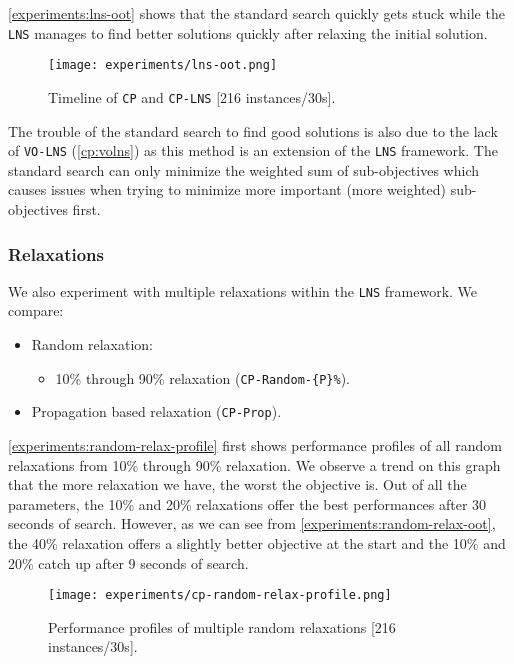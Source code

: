 \documentclass[../../thesis.tex]{subfiles}
\begin{document}
\autoref{experiments:lns-oot} shows that the standard search quickly gets stuck
while the \texttt{LNS} manages to find better solutions quickly after relaxing the initial solution.


\begin{figure}
  \centering
  \texttt{[image: experiments/lns-oot.png]}
  \caption{Timeline of \texttt{CP} and \texttt{CP-LNS} [216 instances/30s].}
  \label{experiments:lns-oot}
\end{figure}


\FloatBarrier

The trouble of the standard search to find good solutions is also due to the lack of \texttt{VO-LNS} (\autoref{cp:volns}) as 
this method is an extension of the \texttt{LNS} framework. The standard search can only minimize the weighted sum of sub-objectives
which causes issues when trying to minimize more important (more weighted) sub-objectives first.



\subsubsection{Relaxations}

We also experiment with multiple relaxations within the \texttt{LNS} framework. We compare:

\begin{itemize}
  \item Random relaxation:
    \begin{itemize}
      \item 10\% through 90\% relaxation (\texttt{CP-Random-\{P\}\%}).
    \end{itemize}
  \item Propagation based relaxation (\texttt{CP-Prop}).
\end{itemize}

\autoref{experiments:random-relax-profile} first shows performance profiles of all random relaxations 
from 10\% through 90\% relaxation. We observe a trend on this graph that the more relaxation we have,
the worst the objective is. Out of all the parameters, the 10\% and 20\% relaxations offer the best performances after 30 seconds of search. However, as we can see from \autoref{experiments:random-relax-oot}, the 40\% relaxation 
offers a slightly better objective at the start and the 10\% and 20\% catch up after 9 seconds of search.


\begin{figure}[H]
  \centering
  \texttt{[image: experiments/cp-random-relax-profile.png]}
  \caption{Performance profiles of multiple random relaxations [216 instances/30s].}
  \label{experiments:random-relax-profile}
\end{figure}
\end{document}
